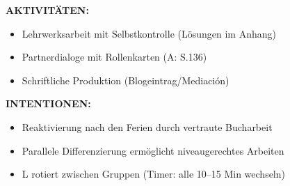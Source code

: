 \documentclass[11pt, a4paper]{article}
\begin{document}
\begin{dsbox}[title={DS 1 -- Bucharbeit parallel (Mo, 05.01.2026)}]
\vspace{0.2cm}

\textbf{AKTIVITÄTEN:}
\begin{itemize}[leftmargin=1.5em, nosep]
    \item Lehrwerksarbeit mit Selbstkontrolle (Lösungen im Anhang)
    \item Partnerdialoge mit Rollenkarten (A: S.136)
    \item Schriftliche Produktion (Blogeintrag/Mediación)
\end{itemize}

\vspace{0.2cm}

\textbf{INTENTIONEN:}
\begin{itemize}[leftmargin=1.5em, nosep]
    \item Reaktivierung nach den Ferien durch vertraute Bucharbeit
    \item Parallele Differenzierung ermöglicht niveaugerechtes Arbeiten
    \item L rotiert zwischen Gruppen (Timer: alle 10--15 Min wechseln)
\end{itemize}

\end{dsbox}

\vspace{0.4cm}
\end{document}
